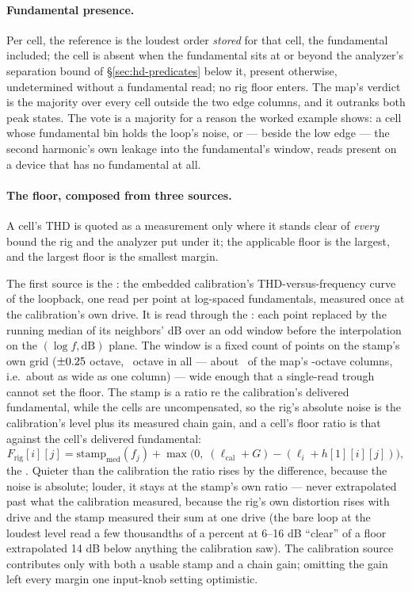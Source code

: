 \documentclass[11pt,a4paper]{article}
\begin{document}
\paragraph{Fundamental presence.} Per cell, the reference is the loudest
order \emph{stored} for that cell, the fundamental included; the cell is
absent when the fundamental sits at or beyond the analyzer's separation
bound of \S\ref{sec:hd-predicates} below it, present otherwise,
undetermined without a fundamental read; no rig floor enters. The map's
verdict is the majority over every cell outside the two edge columns, and
it outranks both peak states. The vote is a majority for a reason the
worked example shows: a cell whose fundamental bin holds the loop's noise,
or --- beside the low edge --- the second harmonic's own leakage into the
fundamental's window, reads present on a device that has no fundamental
at all.

\paragraph{The floor, composed from three sources.}
\label{sec:journey-floor}
A cell's THD is quoted as a measurement only where it stands clear of
\emph{every} bound the rig and the analyzer put under it; the applicable
floor is the largest, and the largest floor is the smallest margin.

The first source is the : the embedded calibration's
THD-versus-frequency curve of the loopback, one read per point at
log-spaced fundamentals, measured once at the calibration's own drive. It
is read through the : each point replaced by the running
median of its neighbors' dB over an odd window before the interpolation
on the $(\log f, \mathrm{dB})$ plane. The window is a fixed count of
points on the stamp's own grid ($\pm0.25$ octave,
\journeyStampMedianWindowOctaves\ octave in all --- about
\journeyStampMedianWindowColumns\ of the map's
\journeyColumnOctaves-octave columns, i.e.\ about as wide as one
column) --- wide enough that a single-read trough cannot set the floor. The stamp is a ratio re the calibration's delivered
fundamental, while the cells are uncompensated, so the rig's absolute noise
is the calibration's level plus its measured chain gain, and a cell's
floor ratio is that against the cell's delivered fundamental:
\begin{equation}
  F_{\mathrm{rig}}[i][j] = \mathrm{stamp}_{\mathrm{med}}(f_j) + \max\!\big(0,\; (\ell_{\mathrm{cal}} + G) - (\ell_i + h[1][i][j])\big),
  \label{eq:driveterm}
\end{equation}
the . Quieter than the calibration the ratio rises by the
difference, because the noise is absolute; louder, it stays at the stamp's
own ratio --- never extrapolated past what the calibration measured,
because the rig's own distortion rises with drive and the stamp measured
their sum at one drive (the bare loop at the loudest level read a few
thousandths of a percent at 6--16 dB ``clear'' of a floor extrapolated
14 dB below anything the calibration saw). The calibration source
contributes only with both a usable stamp and a chain gain; omitting the
gain left every margin one input-knob setting optimistic.
\end{document}
